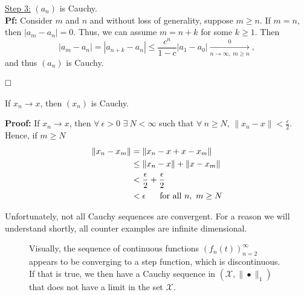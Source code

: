 \ul{Step 3:} $(a_n)$ is Cauchy.\\

\textbf{Pf:} Consider $m$ and $n$ and without loss of generality, suppose $m \ge n$. If $m=n$, then $|a_m-a_n|=0$. Thus, we can assume $m=n+k$ for some $k\ge1$. Then
$$|a_m-a_n|=|a_{n+k}-a_n|\le \frac{c^n}{1-c} |a_1-a_0| \xrightarrow[n\to \infty,~ m\ge n]0,$$
and thus $(a_n)$ is Cauchy.

$\hfill \square$

\Qed


\begin{prop} If $x_n\to x$, then $(x_n)$ is Cauchy.
\end{prop}


\textbf{Proof:} If  $x_n\to x$, then  $\forall ~\epsilon>0$ $\exists~ N<\infty$  such that $\forall ~ n\geq N$, $\|x_n-x\|<\frac{\epsilon}{2}$. Hence, if $m\ge N$    
\begin{align*}
            \| x_n - x_m \| &= \| x_n - x + x - x_m \|\\
            &\leq \| x_n - x \| + \| x- x_m \|\\
            &< \frac{\epsilon}{2} + \frac{\epsilon}{2}\\
            &< \epsilon\ \ \ \ \ \textnormal{for all }n,\ m\geq N
        \end{align*}
\Qed    
    
Unfortunately, not all Cauchy sequences are convergent. For a reason we will understand shortly, all counter examples are infinite dimensional.

\begin{figure}[htb]
\caption[]{Visually, the sequence of continuous functions $(f_n(t))_{n=2}^\infty$ appears to be converging to a step function, which is discontinuous. If that is true, we then have a Cauchy sequence in $(\mathcal{X}, \| \bullet \|_1)$ that does not have a limit in the set $\mathcal{X}$. }
    \label{fig:NonConvergentCauchySequence}
    \end{figure}


